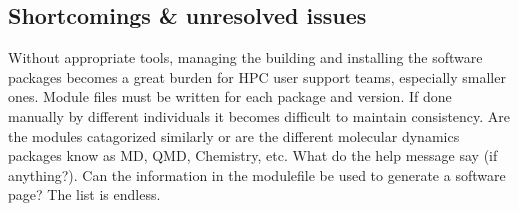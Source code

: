 \subsection{Shortcomings \& unresolved issues}

Without appropriate tools, managing the building and installing the software
packages becomes a great burden for HPC user support teams, especially smaller ones.
Module files must be written for each package and version.  If done
manually by different individuals it becomes difficult to maintain
consistency.  Are the modules catagorized similarly or are the
different molecular dynamics packages know as MD, QMD, Chemistry, etc.
What do the help message say (if anything?).  Can the information in
the modulefile be used to generate a software page?  The list is
endless.


